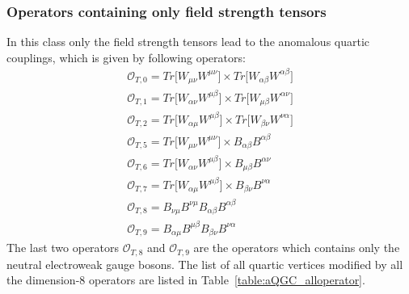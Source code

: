 \subsubsection{Operators containing only field strength tensors} %
\label{ssub:operators_containing_only_field_strength_tensors}
In this class only the field strength tensors lead to the anomalous quartic couplings, which is given by following operators:
\begin{eqnarray}
    \mathcal{O}_{T,0}=Tr\Big[W_{\mu\nu}W^{\mu\nu}]\times Tr\Big[W_{\alpha\beta}W^{\alpha\beta}]\\
    \mathcal{O}_{T,1}=Tr\Big[W_{\alpha\nu}W^{\mu\beta}]\times Tr\Big[W_{\mu\beta}W^{\alpha\nu}]\\
    \mathcal{O}_{T,2}=Tr\Big[W_{\alpha\mu}W^{\mu\beta}]\times Tr\Big[W_{\beta\nu}W^{\nu\alpha}]\\
    \mathcal{O}_{T,5}=Tr\Big[W_{\mu\nu}W^{\mu\nu}]\times B_{\alpha\beta}B^{\alpha\beta}\\
    \mathcal{O}_{T,6}=Tr\Big[W_{\alpha\nu}W^{\mu\beta}]\times B_{\mu\beta}B^{\alpha\nu}\\
    \mathcal{O}_{T,7}=Tr\Big[W_{\alpha\mu}W^{\mu\beta}]\times B_{\beta\nu}B^{\nu\alpha}\\
    \mathcal{O}_{T,8}=B_{\nu\mu}B^{\nu\mu}B_{\alpha\beta}B^{\alpha\beta}\\
    \mathcal{O}_{T,9}=B_{\alpha\mu}B^{\mu\beta}B_{\beta\nu}B^{\nu\alpha}
\end{eqnarray}
The last two operators $\mathcal{O}_{T,8}$ and $\mathcal{O}_{T,9}$ are the operators which contains only the neutral electroweak gauge bosons.
The list of all quartic vertices modified by all the dimension-8 operators are listed in Table~\ref{table:aQGC_alloperator}.

